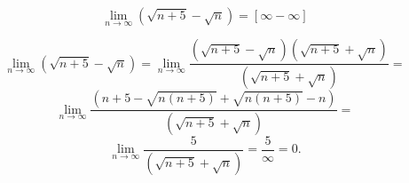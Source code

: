 {}

$$
  \lim_{n\to\infty} (\sqrt{n+5}-\sqrt{n}) = [\infty - \infty]
$$

$$
  \lim_{n\to\infty} (\sqrt{n+5}-\sqrt{n}) =
  \lim_{n\to\infty} \dfrac{(\sqrt{n+5}-\sqrt{n}) (\sqrt{n+5}+\sqrt{n})} {(\sqrt{n+5}+\sqrt{n})} =
$$
$$
  \lim_{n\to\infty} \dfrac{(n+5-\sqrt{n(n+5)}+\sqrt{n(n+5)}-n)} {(\sqrt{n+5}+\sqrt{n})} =
$$
$$
  \lim_{n\to\infty} \dfrac{5}{(\sqrt{n+5}+\sqrt{n})} = \dfrac{5}{\infty} = 0.
$$
